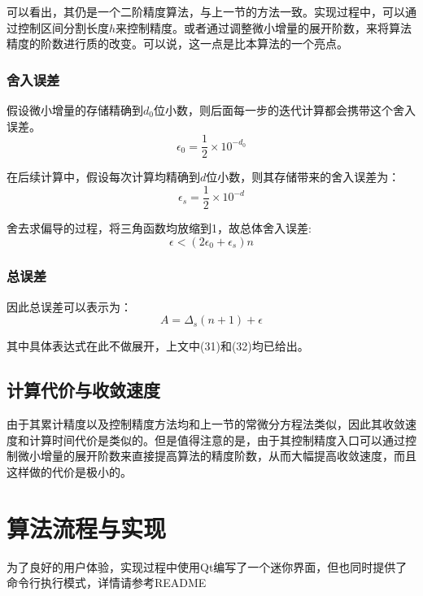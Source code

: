 \documentclass[UTF8]{ctexart}
\begin{document}
可以看出，其仍是一个二阶精度算法，与上一节的方法一致。实现过程中，可以通过控制区间分割长度$h$来控制精度。或者通过调整微小增量的展开阶数，来将算法精度的阶数进行质的改变。可以说，这一点是比本算法的一个亮点。

\subsubsection{舍入误差}

假设微小增量的存储精确到$d_0$位小数，则后面每一步的迭代计算都会携带这个舍入误差。$$\epsilon_0 = \frac{1}{2}\times 10^{-d_0}$$

在后续计算中，假设每次计算均精确到$d$位小数，则其存储带来的舍入误差为：$$\epsilon_s = \frac{1}{2}\times 10^{-d}$$

舍去求偏导的过程，将三角函数均放缩到1，故总体舍入误差:
\begin{equation}
    \epsilon < (2\epsilon_0+\epsilon_s)n
\end{equation}

\subsubsection{总误差}

因此总误差可以表示为：
\begin{equation}
    A = \Delta_s(n+1) +\epsilon
\end{equation}

其中具体表达式在此不做展开，上文中(31)和(32)均已给出。


\subsection{计算代价与收敛速度}

由于其累计精度以及控制精度方法均和上一节的常微分方程法类似，因此其收敛速度和计算时间代价是类似的。但是值得注意的是，由于其控制精度入口可以通过控制微小增量的展开阶数来直接提高算法的精度阶数，从而大幅提高收敛速度，而且这样做的代价是极小的。
\section{算法流程与实现}

为了良好的用户体验，实现过程中使用Qt编写了一个迷你界面，但也同时提供了命令行执行模式，详情请参考README
\end{document}
